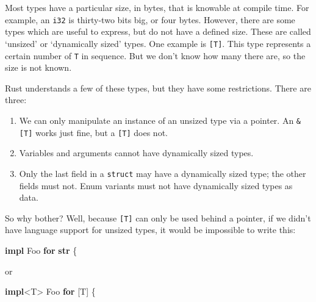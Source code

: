 \documentclass[a4paper,]{book}
\newenvironment{Shaded}{\begin{snugshade}}{\end{snugshade}}
\newcommand{\KeywordTok}[1]{\textcolor[rgb]{0.13,0.29,0.53}{\textbf{{#1}}}}
\newcommand{\NormalTok}[1]{{#1}}
\begin{document}

Most types have a particular size, in bytes, that is knowable at compile
time. For example, an \texttt{i32} is thirty-two bits big, or four
bytes. However, there are some types which are useful to express, but do
not have a defined size. These are called `unsized' or `dynamically
sized' types. One example is \texttt{{[}T{]}}. This type represents a
certain number of \texttt{T} in sequence. But we don't know how many
there are, so the size is not known.

Rust understands a few of these types, but they have some restrictions.
There are three:

\begin{enumerate}
\def\labelenumi{\arabic{enumi}.}
\itemsep1pt\parskip0pt
\item
  We can only manipulate an instance of an unsized type via a pointer.
  An \texttt{\&{[}T{]}} works just fine, but a \texttt{{[}T{]}} does
  not.
\item
  Variables and arguments cannot have dynamically sized types.
\item
  Only the last field in a \texttt{struct} may have a dynamically sized
  type; the other fields must not. Enum variants must not have
  dynamically sized types as data.
\end{enumerate}

So why bother? Well, because \texttt{{[}T{]}} can only be used behind a
pointer, if we didn't have language support for unsized types, it would
be impossible to write this:

\begin{Shaded}
\begin{Highlighting}[]
\KeywordTok{impl} \NormalTok{Foo }\KeywordTok{for} \KeywordTok{str} \NormalTok{\{}
\end{Highlighting}
\end{Shaded}

or

\begin{Shaded}
\begin{Highlighting}[]
\KeywordTok{impl}\NormalTok{<T> Foo }\KeywordTok{for} \NormalTok{[T] \{}
\end{Highlighting}
\end{Shaded}
\end{document}
